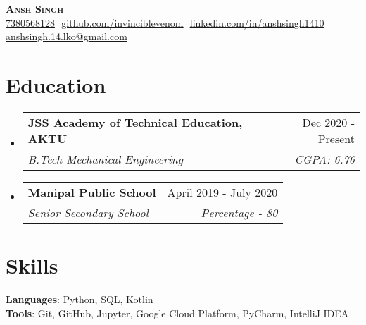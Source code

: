 \documentclass[letterpaper,11pt]{article}
\makeatletter
\newcommand{\resumeSubheading}[4]{
  \vspace{-2pt}\item
    \begin{tabular*}{0.97\textwidth}[t]{l@{\extracolsep{\fill}}r}
      \textbf{#1} & #2 \\
      \textit{\small#3} & \textit{\small #4} \\
    \end{tabular*}\vspace{-7pt}
}
\newcommand{\resumeSubHeadingListStart}{\begin{itemize}[leftmargin=0.15in, label={}]}
\newcommand{\resumeSubHeadingListEnd}{\end{itemize}}
\makeatother
\begin{document}
\begin{flushright}
  \vspace{-4pt}
  \color{gray}
  \item
\end{flushright}

\vspace{-7pt}

\begin{center}
    \textbf{\Huge \scshape Ansh Singh} \\ \vspace{8pt}
    \small 
    {\underline{7380568128}} $  $
    \href{https://github.com/invinciblevenom}{\underline{github.com/invinciblevenom}} $  $
    \href{https://linkedin.com/in/anshsingh1410}{\underline{linkedin.com/in/anshsingh1410}} $  $
    \href{mailto:anshsingh.14.lko@gmail.com}
    {\underline{anshsingh.14.lko@gmail.com}}
\end{center}

\section{Education}
  \resumeSubHeadingListStart
  
    \resumeSubheading
      {JSS Academy of Technical Education, AKTU}{Dec 2020 - Present}
      {B.Tech Mechanical Engineering}{CGPA: 6.76}
    \:
    
    \resumeSubheading
      {Manipal Public School}{April 2019 - July 2020}
      {Senior Secondary School}{Percentage - 80}
    \:

  \resumeSubHeadingListEnd

\section{Skills}
 \begin{itemize}[leftmargin=0.15in, label={}]
    \small{\item{
    
     \textbf{Languages}{: Python, SQL, Kotlin} \\
     
     \textbf{Tools}{: Git, GitHub, Jupyter, Google Cloud Platform, PyCharm, IntelliJ IDEA}
     
     
     
    }}
 \end{itemize}
\end{document}
